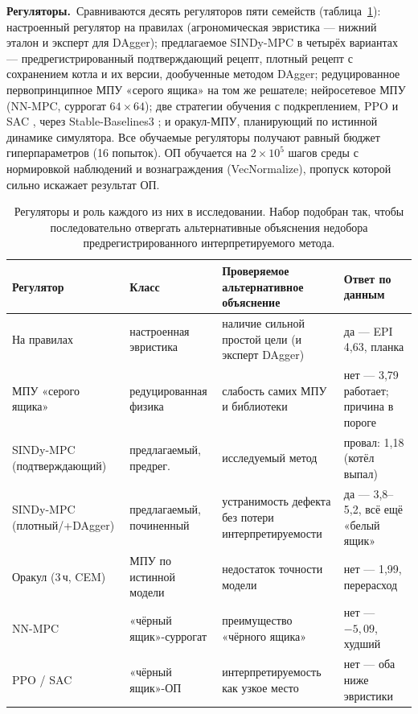 \documentclass[preprint,3p]{elsarticle}
\begin{document}
\textbf{Регуляторы.}~Сравниваются десять регуляторов пяти семейств
(таблица~\ref{tab:controllers}): настроенный регулятор на правилах (агрономическая эвристика —
нижний эталон и эксперт для DAgger); предлагаемое SINDy-MPC в четырёх вариантах —
предрегистрированный подтверждающий рецепт, плотный рецепт с сохранением котла и их версии,
дообученные методом DAgger; редуцированное первопринципное МПУ «серого ящика» на том же
решателе; нейросетевое МПУ (NN-MPC, суррогат $64{\times}64$); две стратегии обучения с
подкреплением, PPO \citep{schulman2017ppo} и SAC \citep{haarnoja2018sac}, через
Stable-Baselines3 \citep{raffin2021sb3}; и оракул-МПУ, планирующий по истинной динамике
симулятора. Все обучаемые регуляторы получают равный бюджет гиперпараметров (16 попыток). ОП
обучается на $2\times10^5$ шагов среды с нормировкой наблюдений и вознаграждения
(VecNormalize), пропуск которой сильно искажает результат ОП.

\begin{table}[t]
\centering
\caption{Регуляторы и роль каждого из них в исследовании. Набор подобран так, чтобы
последовательно отвергать альтернативные объяснения недобора предрегистрированного
интерпретируемого метода.}
\label{tab:controllers}
\small
\begin{tabular}{@{}p{3.0cm}p{2.4cm}p{5.2cm}p{4.0cm}@{}}
\toprule
Регулятор & Класс & Проверяемое альтернативное объяснение & Ответ по данным \\
\midrule
На правилах & настроенная эвристика & наличие сильной простой цели (и эксперт DAgger) & да --- EPI 4,63, планка \\
МПУ «серого ящика» & редуцированная физика & слабость самих МПУ и библиотеки & нет --- 3,79 работает; причина в пороге \\
SINDy-MPC (подтверждающий) & предлагаемый, предрег. & исследуемый метод & провал: 1,18 (котёл выпал) \\
SINDy-MPC (плотный/+DAgger) & предлагаемый, починенный & устранимость дефекта без потери интерпретируемости & да --- 3,8--5,2, всё ещё «белый ящик» \\
Оракул (3\,ч, CEM) & МПУ по истинной модели & недостаток точности модели & нет --- 1,99, перерасход \\
NN-MPC & «чёрный ящик»-суррогат & преимущество «чёрного ящика» & нет --- $-5{,}09$, худший \\
PPO / SAC & «чёрный ящик»-ОП & интерпретируемость как узкое место & нет --- оба ниже эвристики \\
\bottomrule
\end{tabular}
\end{table}
\end{document}
